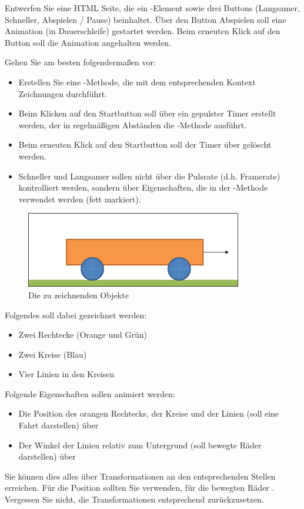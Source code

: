 %
\par Entwerfen Sie eine HTML Seite, die ein -Element sowie drei
Buttons (Langsamer, Schneller, Abspielen / Pause) beinhaltet. Über den Button
Abspielen soll eine Animation (in Dauerschleife) gestartet werden. Beim
erneuten Klick auf den Button soll die Animation angehalten werden.
%
\par Gehen Sie am besten folgendermaßen vor:
%
\begin{itemize}
\item
Erstellen Sie eine -Methode, die mit dem entsprechenden
Kontext Zeichnungen durchführt.
\item
Beim Klicken auf den Startbutton soll über  ein gepulster
Timer erstellt werden, der in regelmäßigen Abständen die
-Methode ausführt.
\item
Beim erneuten Klick auf den Startbutton soll der Timer über
 gelöscht werden.
\item
Schneller und Langsamer sollen nicht über die Pulsrate (d.h. Framerate)
kontrolliert werden, sondern über Eigenschaften, die in der
-Methode verwendet werden (fett markiert).
\end{itemize}
%
\begin{figure}[!h]
\centering
\includegraphics{Exercises/Figures/car.png}
\caption{Die zu zeichnenden Objekte}
\label{fig:car}
\end{figure}
%
\par Folgendes soll dabei gezeichnet werden:
%
\begin{itemize}
\item
Zwei Rechtecke (Orange und Grün)
\item
Zwei Kreise (Blau)
\item
Vier Linien in den Kreisen
\end{itemize}
%
\par Folgende Eigenschaften sollen animiert werden:
%
\begin{itemize}
\item
Die Position des orangen Rechtecks, der Kreise und der Linien (soll eine Fahrt
darstellen) über 
\item
Der Winkel der Linien relativ zum Untergrund (soll bewegte Räder darstellen)
über 
\end{itemize}
%
\par Sie können dies alles über Transformationen an den entsprechenden Stellen
erreichen. Für die Position sollten Sie  verwenden, für die
bewegten Räder . Vergessen Sie nicht, die Transformationen
entsprechend zurückzusetzen.
